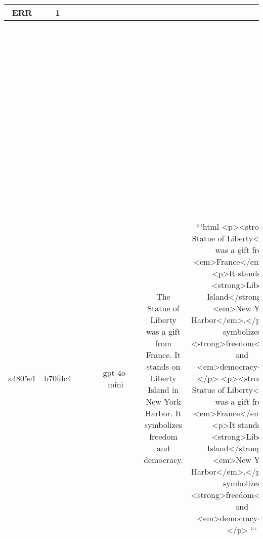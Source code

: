 \begin{table}[h!]
\begin{tabular}{|c|c|c|c|c|c|c|c|c|c|}
ERR & 1\\
\hline
a4805e1 & b70fdc4 &  &  & gpt-4o-mini & The Statue of Liberty was a gift from France. It stands on Liberty Island in New York Harbor. It symbolizes freedom and democracy. & ```html
<p><strong>The Statue of Liberty</strong> was a gift from <em>France</em>.</p>
<p>It stands on <strong>Liberty Island</strong> in <em>New York Harbor</em>.</p>
<p>It symbolizes <strong>freedom</strong> and <em>democracy</em>.</p>
<p><strong>The Statue of Liberty</strong> was a gift from <em>France</em>.</p>
<p>It stands on <strong>Liberty Island</strong> in <em>New York Harbor</em>.</p>
<p>It symbolizes <strong>freedom</strong> and <em>democracy</em>.</p>
``` & ok & The chatbot output contains six <p> tags, which meets the requirement of having at least three <p> tags. Each <p> tag includes at least one <strong> tag and multiple <em> tags, which complies with the requirement to emphasize key words and phrases within each sentence. As the description does not specify the need for unique sentences, repetition of sentences is not a violation. There are no explicit non-compliances with the description. Hence, considering only direct and explicit compliance with the given description, the output follows all the provided guidelines.

No violation.
OK & 1\\
\hline
a4805e1 & b70fdc4 &  &  & gemma2:9b & The Statue of Liberty was a gift from France. It stands on Liberty Island in New York Harbor. It symbolizes freedom and democracy. & Here's the HTML formatting:

<p><strong>The</strong> <em>Statue of Liberty</em> was a <u>gift</u> from <em>France</em>.</p>
<p><strong>It</strong> stands on <em>Liberty Island</em> in <em>New York Harbor</em>.</p>
<p><strong>It</strong> symbolizes <em>freedom</em> and <em>democracy</em>.</p>


Let me know if you'd like to explore other ways to emphasize text within these paragraphs! & ok & The chatbot output includes three sentences, each wrapped in a <p> tag which complies with the requirement of having at least three <p> tags. Additionally, each <p> tag contains one <strong> tag, complying with the instruction to add one <strong> tag per sentence. There are multiple <em> tags within each <p> tag, which also fulfills the requirement to emphasize key words and phrases using multiple <em> tags. Although a <u> tag is present, the description does not prohibit additional HTML tags. Since all essential criteria are met and since the description does not specify that no other tags should appear, the output complies with the description given.


\end{tabular}
\end{table}
